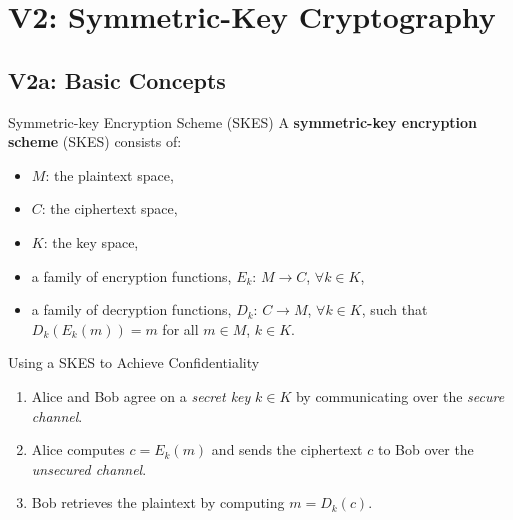 \chapter*{V2: Symmetric-Key Cryptography}
\setcounter{chapter}{1}

\section*{V2a: Basic Concepts}
\setcounter{section}{1}

\begin{Definition}{Symmetric-key Encryption Scheme (SKES)}{}
    A \textbf{symmetric-key encryption scheme} (SKES) consists of:
    \begin{itemize}
        \item $ M $: the plaintext space,
        \item $ C $: the ciphertext space,
        \item $ K $: the key space,
        \item a family of encryption functions, $ E_k $: $ M\to C $,
              $ \forall k\in K $,
        \item a family of decryption functions, $ D_k $: $ C\to M $,
              $ \forall k \in K $, such that $ D_k(E_k(m))=m $ for
              all $ m\in M $, $ k\in K $.
    \end{itemize}
\end{Definition}
Using a SKES to Achieve Confidentiality
\begin{enumerate}
    \item Alice and Bob agree on a \emph{secret key} $ k\in K $
          by communicating over the \emph{secure channel}.
    \item Alice computes $ c=E_k(m) $ and sends the ciphertext
          $ c $ to Bob over the \emph{unsecured channel}.
    \item Bob retrieves the plaintext by computing $ m=D_k(c) $.
\end{enumerate}
